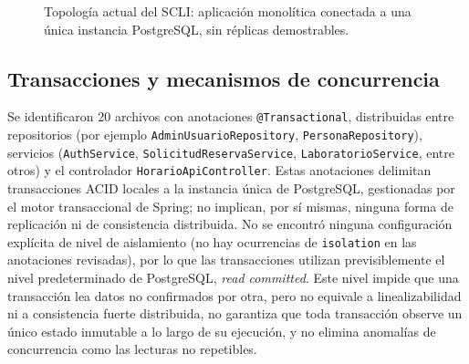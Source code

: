 \documentclass[conference]{IEEEtran}
\begin{document}
\begin{figure}[!t]
\centering
{}
\caption{Topolog\'ia actual del SCLI: aplicaci\'on monol\'itica conectada a una \'unica instancia PostgreSQL, sin r\'eplicas demostrables.}
\label{fig:topologia-actual}
\end{figure}

\subsection{Transacciones y mecanismos de concurrencia}

Se identificaron 20 archivos con anotaciones \texttt{@Transactional}, distribuidas entre repositorios (por ejemplo \texttt{AdminUsuarioRepository}, \texttt{PersonaRepository}), servicios (\texttt{AuthService}, \texttt{SolicitudReservaService}, \texttt{LaboratorioService}, entre otros) y el controlador \texttt{HorarioApiController}. Estas anotaciones delimitan transacciones ACID locales a la instancia \'unica de PostgreSQL, gestionadas por el motor transaccional de Spring; no implican, por s\'i mismas, ninguna forma de replicaci\'on ni de consistencia distribuida. No se encontr\'o ninguna configuraci\'on expl\'icita de nivel de aislamiento (no hay ocurrencias de \texttt{isolation} en las anotaciones revisadas), por lo que las transacciones utilizan previsiblemente el nivel predeterminado de PostgreSQL, \emph{read committed}. Este nivel impide que una transacci\'on lea datos no confirmados por otra, pero no equivale a linealizabilidad ni a consistencia fuerte distribuida, no garantiza que toda transacci\'on observe un \'unico estado inmutable a lo largo de su ejecuci\'on, y no elimina anomal\'ias de concurrencia como las lecturas no repetibles.
\end{document}
